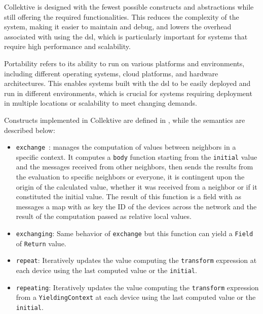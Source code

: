 Collektive is designed with the fewest possible constructs and abstractions while still offering the required functionalities. This reduces the complexity of the system, making it easier to maintain and debug, and lowers the overhead associated with using the \ac{dsl}, which is particularly important for systems that require high performance and scalability.

Portability refers to its ability to run on various platforms and environments, including different operating systems, cloud platforms, and hardware architectures. This enables systems built with the \ac{dsl} to be easily deployed and run in different environments, which is crucial for systems requiring deployment in multiple locations or scalability to meet changing demands.

Constructs implemented in Collektive are defined in , while the semantics are described below:

\begin{itemize}
    \item \texttt{exchange}~\cite{https://doi.org/10.4230/lipics.ecoop.2022.20}: manages the computation of values between neighbors in a specific context. It computes a \texttt{body} function starting from the \texttt{initial} value and the messages received from other neighbors, then sends the results from the evaluation to specific neighbors or everyone, it is contingent upon the origin of the calculated value, whether it was received from a neighbor or if it constituted the initial value. The result of this function is a field with as messages a map with as key the ID of the devices across the network and the result of the computation passed as relative local values.
    \item \texttt{exchanging}: Same behavior of \texttt{exchange} but this function can yield a \texttt{Field} of \texttt{Return} value.
    \item \texttt{repeat}: Iteratively updates the value computing the \texttt{transform} expression at each device using the last computed value or the \texttt{initial}.
    \item \texttt{repeating}: Iteratively updates the value computing the \texttt{transform} expression from a \texttt{YieldingContext} at each device using the last computed value or the \texttt{initial}.
\end{itemize}



